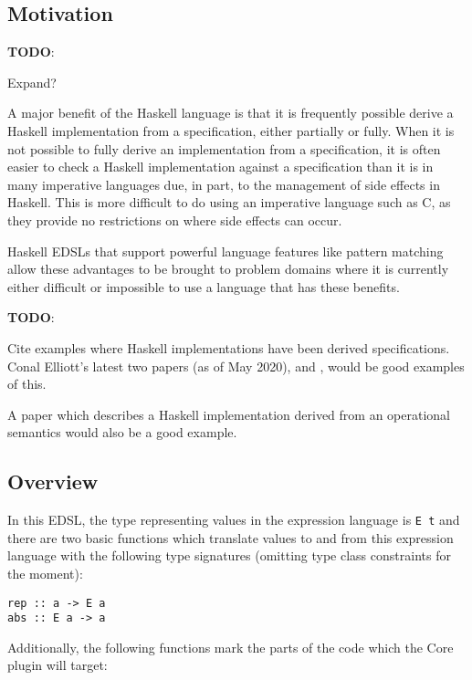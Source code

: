 \documentclass[sigplan,anonymous,review]{acmart}
\newcommand{\ttt}{\texttt}
\newenvironment{todo}
  {\begin{tcolorbox}
   \textbf{TODO}:
  }
  {\end{tcolorbox}
  }
\begin{document}
\subsection{Motivation}

\begin{todo}
  Expand?
\end{todo}

A major benefit of the Haskell language is that it is frequently possible derive
a Haskell implementation from a specification, either partially or fully. When
it is not possible to fully derive an implementation from a specification, it is
often easier to check a Haskell implementation against a specification than it
is in many imperative languages due, in part, to the management of side effects
in Haskell. This is more difficult to do using an imperative language such as C,
as they provide no restrictions on where side effects can occur.

Haskell EDSLs that support powerful language features like pattern matching
allow these advantages to be brought to problem domains where it is currently
either difficult or impossible to use a language that has these benefits.

\begin{todo}
  Cite examples where Haskell implementations have been derived specifications.
  Conal Elliott's latest two papers (as of May 2020),
  \cite{Elliott-2018-ad-icfp} and \cite{Elliott2019-convolution-extended}, would
  be good examples of this.

  A paper which describes a Haskell implementation derived from an operational
  semantics would also be a good example.
\end{todo}

\subsection{Overview}

In this EDSL, the type representing values in the expression language is \ttt{E
t} and there are two basic functions which translate values to and from this
expression language with the following type signatures (omitting type class
constraints for the moment):

\begin{lstlisting}
rep :: a -> E a
abs :: E a -> a
\end{lstlisting}

Additionally, the following functions mark the parts of the code which the Core
plugin will target:
\end{document}
